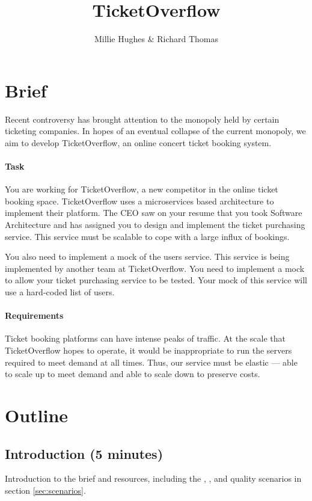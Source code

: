 \documentclass{csse4400}
\title{TicketOverflow}
\author{Millie Hughes \& Richard Thomas}
\date{\week[tutorial]{9}}
\begin{document}
\maketitle

\section{Brief}

Recent controversy has brought attention to the monopoly held by certain ticketing companies.
In hopes of an eventual collapse of the current monopoly,
we aim to develop TicketOverflow, an online concert ticket booking system.

\paragraph{Task}
You are working for TicketOverflow, a new competitor in the online ticket booking space.
Ticket\-Overflow uses a microservices based architecture to implement their platform.
The CEO saw on your resume that you took Software Architecture and has assigned you to design and implement the ticket purchasing service.
This service must be scalable to cope with a large influx of bookings.

You also need to implement a mock of the users service.
This service is being implemented by another team at TicketOverflow.
You need to implement a mock to allow your ticket purchasing service to be tested.
Your mock of this service will use a hard-coded list of users.

\paragraph{Requirements}
Ticket booking platforms can have intense peaks of traffic.
At the scale that Ticket\-Overflow hopes to operate,
it would be inappropriate to run the servers required to meet demand at all times.
Thus, our service must be elastic --- able to scale up to meet demand and able to scale down to preserve costs.


\section{Outline}

\subsection*{Introduction (5 minutes)}
Introduction to the brief and resources,
including the ,
,
and quality scenarios in section \ref{sec:scenarios}.
\end{document}
